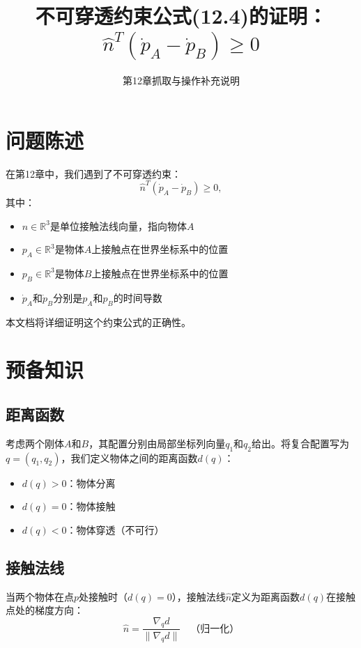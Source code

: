 \documentclass[12pt,a4paper]{article}
\title{不可穿透约束公式(12.4)的证明：$\hat{n}^T (\dot{p}_A - \dot{p}_B) \geq 0$}
\author{第12章抓取与操作补充说明}
\date{}
\begin{document}
\maketitle

\section{问题陈述}

在第12章中，我们遇到了不可穿透约束：
\begin{equation}
\hat{n}^T (\dot{p}_A - \dot{p}_B) \geq 0,
\label{eq:12.4}
\end{equation}
其中：
\begin{itemize}
\item $\hat{n} \in \mathbb{R}^3$是单位接触法线向量，指向物体$A$
\item $p_A \in \mathbb{R}^3$是物体$A$上接触点在世界坐标系中的位置
\item $p_B \in \mathbb{R}^3$是物体$B$上接触点在世界坐标系中的位置
\item $\dot{p}_A$和$\dot{p}_B$分别是$p_A$和$p_B$的时间导数
\end{itemize}

本文档将详细证明这个约束公式的正确性。

\section{预备知识}

\subsection{距离函数}

考虑两个刚体$A$和$B$，其配置分别由局部坐标列向量$q_1$和$q_2$给出。将复合配置写为$q = (q_1, q_2)$，我们定义物体之间的距离函数$d(q)$：
\begin{itemize}
\item $d(q) > 0$：物体分离
\item $d(q) = 0$：物体接触
\item $d(q) < 0$：物体穿透（不可行）
\end{itemize}

\subsection{接触法线}

当两个物体在点$p$处接触时（$d(q) = 0$），接触法线$\hat{n}$定义为距离函数$d(q)$在接触点处的梯度方向：
\begin{equation}
\hat{n} = \frac{\nabla_q d}{\|\nabla_q d\|} \quad \text{（归一化）}
\end{equation}
\end{document}
